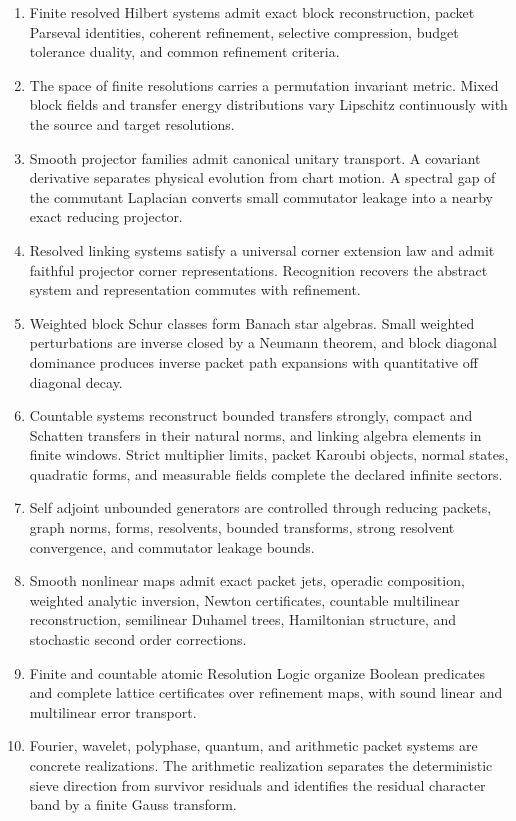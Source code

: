 \documentclass{aomart}
\theoremstyle{definition}
\theoremstyle{remark}
\begin{document}
\begin{enumerate}
\item Finite resolved Hilbert systems admit exact block reconstruction, packet Parseval identities, coherent refinement, selective compression, budget tolerance duality, and common refinement criteria.
\item The space of finite resolutions carries a permutation invariant metric. Mixed block fields and transfer energy distributions vary Lipschitz continuously with the source and target resolutions.
\item Smooth projector families admit canonical unitary transport. A covariant derivative separates physical evolution from chart motion. A spectral gap of the commutant Laplacian converts small commutator leakage into a nearby exact reducing projector.
\item Resolved linking systems satisfy a universal corner extension law and admit faithful projector corner representations. Recognition recovers the abstract system and representation commutes with refinement.
\item Weighted block Schur classes form Banach star algebras. Small weighted perturbations are inverse closed by a Neumann theorem, and block diagonal dominance produces inverse packet path expansions with quantitative off diagonal decay.
\item Countable systems reconstruct bounded transfers strongly, compact and Schatten transfers in their natural norms, and linking algebra elements in finite windows. Strict multiplier limits, packet Karoubi objects, normal states, quadratic forms, and measurable fields complete the declared infinite sectors.
\item Self adjoint unbounded generators are controlled through reducing packets, graph norms, forms, resolvents, bounded transforms, strong resolvent convergence, and commutator leakage bounds.
\item Smooth nonlinear maps admit exact packet jets, operadic composition, weighted analytic inversion, Newton certificates, countable multilinear reconstruction, semilinear Duhamel trees, Hamiltonian structure, and stochastic second order corrections.
\item Finite and countable atomic Resolution Logic organize Boolean predicates and complete lattice certificates over refinement maps, with sound linear and multilinear error transport.
\item Fourier, wavelet, polyphase, quantum, and arithmetic packet systems are concrete realizations. The arithmetic realization separates the deterministic sieve direction from survivor residuals and identifies the residual character band by a finite Gauss transform.

\end{enumerate}
\end{document}
